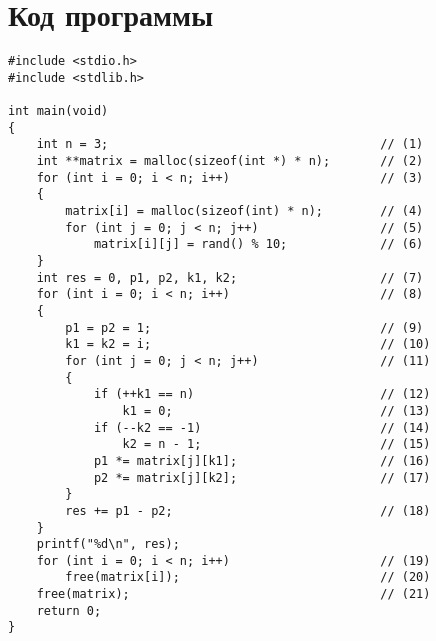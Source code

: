 \setcounter{page}{2}
\chapter{Код программы}

\captionsetup{singlelinecheck = false, justification=raggedright}
\begin{lstlisting}[label=code, caption=Реализация алгоритма вычисления определителя квадратной матрицы]
#include <stdio.h>
#include <stdlib.h>

int main(void)
{
    int n = 3;                                      // (1)
    int **matrix = malloc(sizeof(int *) * n);       // (2)
    for (int i = 0; i < n; i++)                     // (3)
    {
        matrix[i] = malloc(sizeof(int) * n);        // (4)
        for (int j = 0; j < n; j++)                 // (5)
            matrix[i][j] = rand() % 10;             // (6)
    }
    int res = 0, p1, p2, k1, k2;                    // (7)
    for (int i = 0; i < n; i++)                     // (8)
    {
        p1 = p2 = 1;                          	    // (9)
        k1 = k2 = i;                                // (10)
        for (int j = 0; j < n; j++)                 // (11)
        {
            if (++k1 == n)                          // (12)
                k1 = 0;                             // (13)
            if (--k2 == -1)                         // (14)
                k2 = n - 1;                         // (15)
            p1 *= matrix[j][k1];                    // (16)
            p2 *= matrix[j][k2];                    // (17)
        }
        res += p1 - p2;                             // (18)
    }
    printf("%d\n", res);
    for (int i = 0; i < n; i++)                     // (19)
        free(matrix[i]);                            // (20)
    free(matrix);                                   // (21)
    return 0;
}
\end{lstlisting}
\captionsetup{singlelinecheck = false, justification=centering}